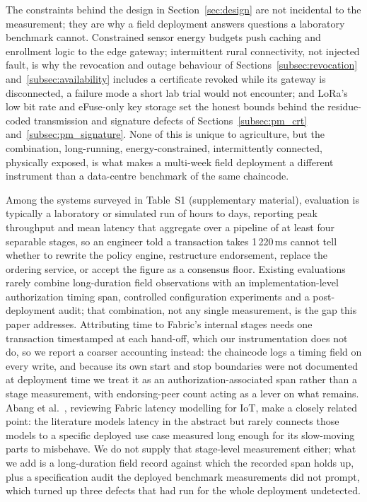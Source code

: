 \documentclass[a4paper,fleqn]{cas-sc}
\begin{document}
The constraints behind the design in Section~\ref{sec:design} are not
incidental to the measurement; they are why a field deployment answers
questions a laboratory benchmark cannot. Constrained sensor energy budgets
push caching and enrollment logic to the edge gateway; intermittent rural
connectivity, not injected fault, is why the revocation and outage
behaviour of Sections~\ref{subsec:revocation}
and~\ref{subsec:availability} includes a certificate revoked while its
gateway is disconnected, a failure mode a short lab trial would not
encounter; and LoRa's low bit rate and eFuse-only key storage set the
honest bounds behind the residue-coded transmission and signature defects
of Sections~\ref{subsec:pm_crt} and~\ref{subsec:pm_signature}. None of
this is unique to agriculture, but the combination, long-running,
energy-constrained, intermittently connected, physically exposed, is what
makes a multi-week field deployment a different instrument than a
data-centre benchmark of the same chaincode.

Among the systems surveyed in Table~S1 (supplementary material), evaluation
is typically a laboratory or simulated run of hours to days, reporting peak
throughput and mean latency that aggregate over a pipeline of at least four
separable stages, so an engineer told a transaction takes 1\,220\,ms cannot
tell whether to rewrite the policy engine, restructure endorsement, replace
the ordering service, or accept the figure as a consensus floor. Existing
evaluations rarely combine long-duration field observations with an
implementation-level authorization timing span, controlled configuration
experiments and a post-deployment audit; that combination, not any single
measurement, is the gap this paper addresses. Attributing time to Fabric's
internal stages needs one transaction timestamped at each hand-off, which
our instrumentation does not do, so we report a coarser accounting instead:
the chaincode logs a timing field on every write, and because its own start
and stop boundaries were not documented at deployment time we treat it as an
authorization-associated span rather than a stage measurement, with
endorsing-peer count acting as a lever on what remains. Abang et
al.\ \cite{abang2024latency}, reviewing Fabric latency modelling for IoT,
make a closely related point: the literature models latency in the abstract
but rarely connects those models to a specific deployed use case measured
long enough for its slow-moving parts to misbehave. We do not supply that
stage-level measurement either; what we add is a long-duration field record
against which the recorded span holds up, plus a specification audit the
deployed benchmark measurements did not prompt, which turned up three
defects that had run for the whole deployment undetected.
\end{document}
